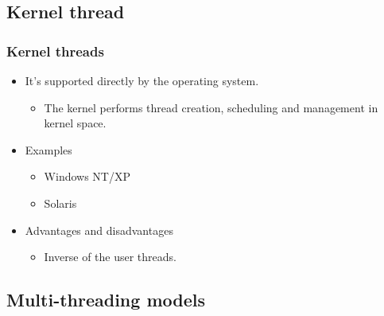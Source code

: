 \documentclass[CJKutf8,xcolor=pdftex,dvipsnames,table]{beamer}
\begin{document}
\begin{CJK*}{UTF8}{song}
  \subsection{Kernel thread}

  \begin{frame}
  \frametitle{Kernel threads} \pause
  \begin{itemize}
  \item{It's supported directly by the operating system.} \pause
    \begin{itemize}
    \item{The kernel performs thread creation, scheduling and management in kernel space.} \pause
    \end{itemize}
  \item{Examples} \pause
    \begin{itemize}
    \item{Windows NT/XP} \pause
    \item{Solaris} \pause
    \end{itemize}
  \item{Advantages and disadvantages} \pause
    \begin{itemize}
    \item{Inverse of the user threads.}
    \end{itemize}
  \end{itemize}
  \end{frame}

  \iffalse

  \subsection{Multi-threading models}


\end{CJK*}
\end{document}
